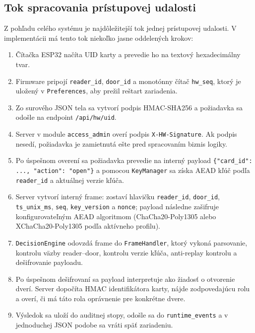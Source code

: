 \documentclass[journal,a4paper,onecolumn]{IEEEtran}
\begin{document}

\subsection{Tok spracovania prístupovej udalosti}

Z pohľadu celého systému je najdôležitejší tok jednej prístupovej udalosti. V implementácii má tento tok niekoľko jasne oddelených krokov:

\begin{enumerate}[leftmargin=*,itemsep=3pt]
  \item Čítačka ESP32 načíta UID karty a prevedie ho na textový hexadecimálny tvar.
  \item Firmware pripojí \texttt{reader\_id}, \texttt{door\_id} a monotónny čítač \texttt{hw\_seq}, ktorý je uložený v \texttt{Preferences}, aby prežil reštart zariadenia.
  \item Zo surového JSON tela sa vytvorí podpis HMAC-SHA256 a požiadavka sa odošle na endpoint \texttt{/api/hw/uid}.
  \item Server v module \texttt{access\_admin} overí podpis \texttt{X-HW-Signature}. Ak podpis nesedí, požiadavka je zamietnutá ešte pred spracovaním biznis logiky.
  \item Po úspešnom overení sa požiadavka prevedie na interný payload \texttt{\{"card\_id": ..., "action": "open"\}} a pomocou \texttt{KeyManager} sa získa AEAD kľúč podľa \texttt{reader\_id} a aktuálnej verzie kľúča.
  \item Server vytvorí interný frame: zostaví hlavičku \texttt{reader\_id}, \texttt{door\_id}, \texttt{ts\_unix\_ms}, \texttt{seq}, \texttt{key\_version} a \texttt{nonce}; payload následne zašifruje konfigurovateľným AEAD algoritmom (ChaCha20-Poly1305 alebo XChaCha20-Poly1305 podľa aktívneho profilu).
  \item \texttt{DecisionEngine} odovzdá frame do \texttt{FrameHandler}, ktorý vykoná parsovanie, kontrolu väzby reader--door, kontrolu verzie kľúča, anti-replay kontrolu a dešifrovanie payloadu.
  \item Po úspešnom dešifrovaní sa payload interpretuje ako žiadosť o otvorenie dverí. Server dopočíta HMAC identifikátora karty, nájde zodpovedajúcu rolu a overí, či má táto rola oprávnenie pre konkrétne dvere.
  \item Výsledok sa uloží do auditnej stopy, odošle sa do \texttt{runtime\_events} a v jednoduchej JSON podobe sa vráti späť zariadeniu.
\end{enumerate}
\end{document}
